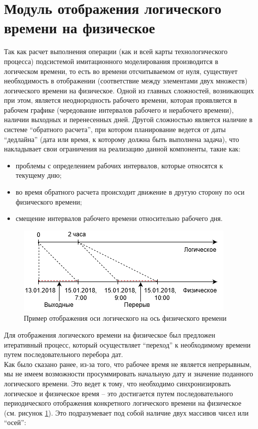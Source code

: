 \section{Модуль отображения логического времени на физическое}
\indent Так как расчет выполнения операции (как и всей карты технологического процесса) подсистемой имитационного моделирования производится в логическом времени, то есть во времени отсчитываемом от нуля, существует необходимость в отображении (соответствие между элементами двух множеств) логического времени на физическое.
Одной из главных сложностей, возникающих при этом, является неоднородность рабочего времени, которая проявляется в рабочем графике (чередование интервалов рабочего и нерабочего времени), наличии выходных и перенесенных дней.
Другой сложностью является наличие в системе ``обратного расчета'', при котором планирование ведется от даты ``дедлайна'' (дата или время, к которому должна быть выполнена задача), что накладывает свои ограничения на реализацию данной компоненты, такие как:
\begin{itemize}
	\item проблемы с определением рабочих интервалов, которые относятся к текущему дню;
	\item во время обратного расчета происходит движение в другую сторону по оси физического времени;
	\item смещение интервалов рабочего времени относительно рабочего дня.
\end{itemize}
\begin{figure}[h!]
	\centering
	\includegraphics[width=0.8\linewidth]{pics/scheduleAxes.png}
	\caption{Пример отображения оси логического на ось физического времени}
	\label{fig:axes}
\end{figure}

\indent Для отображения логического времени на физическое был предложен итеративный процесс, который осуществляет ``переход'' к необходимому времени путем последовательного перебора дат.\\
\indent Как было сказано ранее, из-за того, что рабочее время не является непрерывным, мы не имеем возможности просуммировать начальную дату и значение поданного логического времени.
Это ведет к тому, что необходимо синхронизировать логическое и физическое время -- это достигается путем последовательного периодического отображения конкретного логического времени на физическое (см. рисунок \ref{fig:axes}).
Это подразумевает под собой наличие двух массивов чисел или ``осей'':


